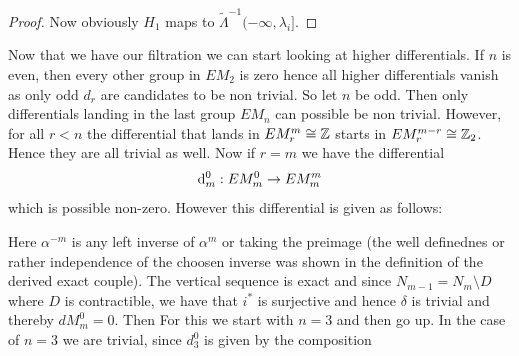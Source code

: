 \begin{example}
\begin{proof}
Now obviously $H_1$ maps to  $\tilde{\Lambda}^{-1}(-\infty,\lambda_i]$. 
	\end{proof}
	
	
	
	 Now that we have our filtration we can start looking at higher differentials. If $n$ is even, then every other group in $EM_2$ is zero hence all higher differentials vanish as only odd $d_r$ are candidates to be non trivial. So let $n$ be odd. Then only differentials landing in the last group $EM_n$ can possible be non trivial. However, for all $r<n$ the differential that lands in $EM_r^m \cong \mathbb{Z}$ starts in $EM_r^{m-r}\cong \mathbb{Z}_2$. Hence they are all trivial as well. Now if $r=m$ we have the differential 
	 \begin{equation*}
	 	\mathop{}\!\mathrm{d}_m^0:  EM_m^0 \to EM_m^m
	 \end{equation*} which is possible non-zero. However this differential is given as follows: 
	 
	 \begin{center}
	 \end{center}
	 Here $\alpha^{-m}$ is any left inverse of $\alpha^m$ or taking the preimage (the well definednes or rather independence of the choosen inverse was shown in the definition of the derived exact couple). The vertical sequence is exact and since $N_{m-1}=N_m\setminus D$ where $D$ is contractible, we have that $i^*$ is surjective and hence $\delta$ is trivial and thereby $dM_m^0=0$.
	  Then For this we start with $n=3$ and then go up. In the case of $n=3$ we are trivial, since $d^0_3$ is given by the composition
	\begin{center}
	\end{center}


\end{example}
